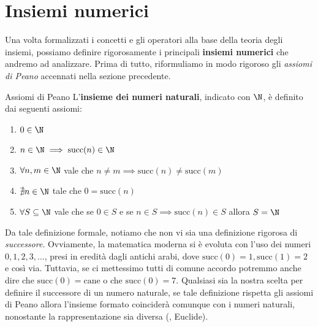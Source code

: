 \documentclass[a4paper, 12pt]{report}
\begin{document}
    \newpage

    \section{Insiemi numerici}

    Una volta formalizzati i concetti e gli operatori alla base della teoria degli insiemi, possiamo definire rigorosamente i principali \textbf{insiemi numerici} che andremo ad analizzare. Prima di tutto, riformuliamo in modo rigoroso gli \textit{assiomi di Peano} accennati nella sezione precedente.

    \begin{frameddefn}{Assiomi di Peano}
        L'\textbf{insieme dei numeri naturali}, indicato con $\N$, è definito dai seguenti assiomi:
        \begin{enumerate}
            \item $0 \in \N$
            \item $n \in \N \implies \mathrm{succ}(n) \in \N$
            \item $\forall n,m \in \N$ vale che $n \neq m \implies \mathrm{succ}(n) \neq \mathrm{succ}(m)$
            \item $\nexists n \in \N$ tale che $0 = \mathrm{succ}(n)$
            \item $\forall S \subseteq \N$ vale che se $0 \in S$ e se $n \in S \implies \mathrm{succ}(n) \in S$ allora $S = \N$
        \end{enumerate}
    \end{frameddefn}

    Da tale definizione formale, notiamo che non vi sia una definizione rigorosa di \textit{successore}. Ovviamente, la matematica moderna si è evoluta con l'uso dei numeri $0,1,2,3, \ldots$, presi in eredità dagli antichi arabi, dove $\mathrm{succ}(0) = 1, \mathrm{succ}(1) = 2$ e così via. Tuttavia, se ci mettessimo tutti di comune accordo potremmo anche dire che $\mathrm{succ}(0) = \text{cane}$ o che $\mathrm{succ}(0) = 7$. Qualsiasi sia la nostra scelta per definire il successore di un numero naturale, se tale definizione rispetta gli assiomi di Peano allora l'insieme formato coinciderà comunque con i numeri naturali, nonostante la rappresentazione sia diversa (, Euclide).
\end{document}
